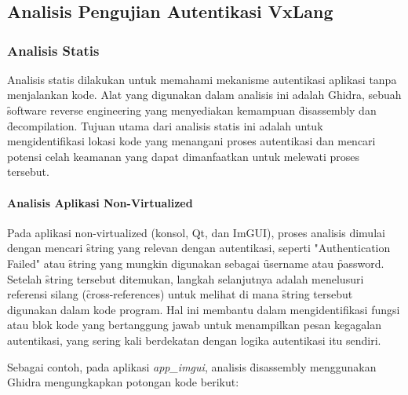 \chapter{\babLima}

\section{Analisis Pengujian Autentikasi  VxLang}
\subsection{Analisis Statis}
Analisis statis dilakukan untuk memahami mekanisme autentikasi aplikasi tanpa menjalankan kode. Alat yang digunakan dalam analisis ini adalah Ghidra, sebuah \f{software reverse engineering} yang menyediakan kemampuan \f{disassembly} dan \f{decompilation}. Tujuan utama dari analisis statis ini adalah untuk mengidentifikasi lokasi kode yang menangani proses autentikasi dan mencari potensi celah keamanan yang dapat dimanfaatkan untuk melewati proses tersebut.

\subsubsection{Analisis Aplikasi Non-Virtualized}
Pada aplikasi non-virtualized (konsol, Qt, dan ImGUI), proses analisis dimulai dengan mencari \f{string} yang relevan dengan autentikasi, seperti "Authentication Failed" atau \f{string} yang mungkin digunakan sebagai \f{username} atau \f{password}. Setelah \f{string} tersebut ditemukan, langkah selanjutnya adalah menelusuri referensi silang (\f{cross-references}) untuk melihat di mana \f{string} tersebut digunakan dalam kode program. Hal ini membantu dalam mengidentifikasi fungsi atau blok kode yang bertanggung jawab untuk menampilkan pesan kegagalan autentikasi, yang sering kali berdekatan dengan logika autentikasi itu sendiri.

Sebagai contoh, pada aplikasi \textit{app\_imgui}, analisis \f{disassembly} menggunakan Ghidra mengungkapkan potongan kode berikut:

